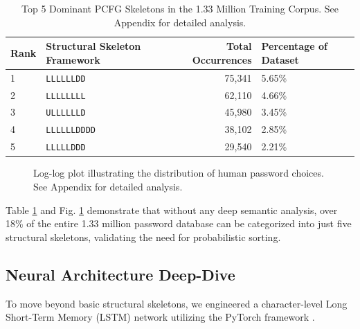 \documentclass[conference]{IEEEtran}
\begin{document}
\begin{table}[htbp]
\renewcommand{\arraystretch}{1.6}
\caption{Top 5 Dominant PCFG Skeletons in the 1.33 Million Training Corpus. See Appendix for detailed analysis.}
\begin{center}
\begin{tabular}{@{}llrl@{}}
\toprule
\textbf{Rank} & \textbf{Structural Skeleton Framework} & \textbf{Total Occurrences} & \textbf{Percentage of Dataset} \\ \midrule
1 & \texttt{LLLLLLDD} & 75,341 & 5.65\% \\
2 & \texttt{LLLLLLLL} & 62,110 & 4.66\% \\
3 & \texttt{ULLLLLLD} & 45,980 & 3.45\% \\
4 & \texttt{LLLLLLDDDD} & 38,102 & 2.85\% \\
5 & \texttt{LLLLLDDD} & 29,540 & 2.21\% \\ \bottomrule
\end{tabular}
\label{tab:pcfg}
\end{center}
\end{table}

\begin{figure}[htbp]
\centering
{}
\caption{Log-log plot illustrating the distribution of human password choices. See Appendix for detailed analysis.}
\label{fig:zipf}
\end{figure}

Table \ref{tab:pcfg} and Fig. \ref{fig:zipf} demonstrate that without any deep semantic analysis, over 18\% of the entire 1.33 million password database can be categorized into just five structural skeletons, validating the need for probabilistic sorting.

\subsection{Neural Architecture Deep-Dive}

To move beyond basic structural skeletons, we engineered a character-level Long Short-Term Memory (LSTM) network utilizing the PyTorch framework \cite{paszke2019}. 
\end{document}
